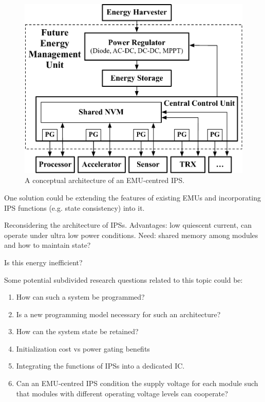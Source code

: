 \begin{figure}
  \centering
  \includegraphics[width=0.8\columnwidth]{ch6_conclusion/figures/EMUIPSarch.pdf}
  \caption{A conceptual architecture of an EMU-centred IPS.}
  \label{fig:emuips}
\end{figure}

One solution could be extending the features of existing EMUs and incorporating IPS functions (e.g. state consistency) into it. 

Reconsidering the architecture of IPSs.
Advantages: low quiescent current, can operate under ultra low power conditions.
Need: shared memory among modules and how to maintain state?


Is this energy inefficient?


Some potential subdivided research questions related to this topic could be:
\begin{enumerate}
    \item How can such a system be programmed?
    \item Is a new programming model necessary for such an architecture?
    \item How can the system state be retained?
    \item Initialization cost vs power gating benefits
    \item Integrating the functions of IPSs into a dedicated IC. 
    \item Can an EMU-centred IPS condition the supply voltage for each module such that modules with different operating voltage levels can cooperate? 
\end{enumerate}
